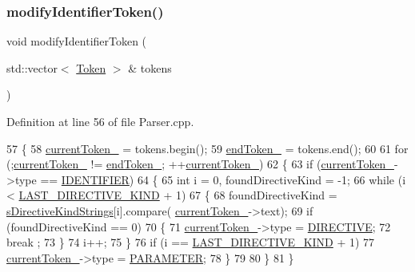 \subsubsection{\texorpdfstring{modify\+Identifier\+Token()}{modifyIdentifierToken()}}
{\footnotesize\ttfamily void modify\+Identifier\+Token (\begin{DoxyParamCaption}\item[{std\+::vector$<$ \hyperlink{classft_1_1_token}{Token} $>$ \&}]{tokens }\end{DoxyParamCaption})\hspace{0.3cm}{\ttfamily [private]}}



Definition at line 56 of file Parser.\+cpp.


\begin{DoxyCode}
57     \{
58         \hyperlink{classft_1_1_parser_a942c5b794d108f144c5b5028aaa34cb6}{currentToken\_} = tokens.begin();
59         \hyperlink{classft_1_1_parser_a538ba3ab8ee1d0cef5cc3c999f3ab44c}{endToken\_} = tokens.end();
60 
61         \textcolor{keywordflow}{for} (;\hyperlink{classft_1_1_parser_a942c5b794d108f144c5b5028aaa34cb6}{currentToken\_} != \hyperlink{classft_1_1_parser_a538ba3ab8ee1d0cef5cc3c999f3ab44c}{endToken\_}; ++\hyperlink{classft_1_1_parser_a942c5b794d108f144c5b5028aaa34cb6}{currentToken\_})
62         \{
63             \textcolor{keywordflow}{if} (\hyperlink{classft_1_1_parser_a942c5b794d108f144c5b5028aaa34cb6}{currentToken\_}->type == \hyperlink{namespaceft_aa520fbf142ba1e7e659590c07da31921a84f8ae2490f9e4bd2321fd21f4b0e807}{IDENTIFIER})
64             \{
65                 \textcolor{keywordtype}{int} i = 0, foundDirectiveKind = -1;
66                 \textcolor{keywordflow}{while} (i < \hyperlink{_directive_8hpp_a0ad99aeee867cb461c93463d5772ac86}{LAST\_DIRECTIVE\_KIND} + 1)
67                 \{
68                     foundDirectiveKind = \hyperlink{namespaceft_a2896a632198d516af93e4aea2d125f59}{sDirectiveKindStrings}[i].compare(
      \hyperlink{classft_1_1_parser_a942c5b794d108f144c5b5028aaa34cb6}{currentToken\_}->text);
69                     \textcolor{keywordflow}{if} (foundDirectiveKind == 0)
70                     \{
71                         \hyperlink{classft_1_1_parser_a942c5b794d108f144c5b5028aaa34cb6}{currentToken\_}->type = \hyperlink{namespaceft_aa520fbf142ba1e7e659590c07da31921ae3852cb010d5e422026faf83b3c16f0e}{DIRECTIVE};
72                         break ;
73                     \}
74                     i++;
75                 \}
76                 \textcolor{keywordflow}{if} (i == \hyperlink{_directive_8hpp_a0ad99aeee867cb461c93463d5772ac86}{LAST\_DIRECTIVE\_KIND} + 1)
77                     \hyperlink{classft_1_1_parser_a942c5b794d108f144c5b5028aaa34cb6}{currentToken\_}->type = \hyperlink{namespaceft_aa520fbf142ba1e7e659590c07da31921a194cde856bd2d79eac8adb9741c55940}{PARAMETER};
78             \}
79 
80         \}
81     \}
\end{DoxyCode}

